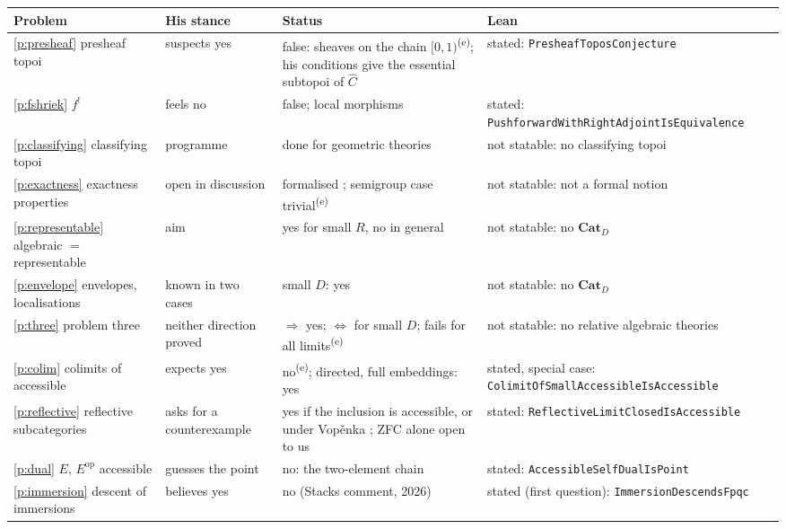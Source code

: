 \documentclass[11pt,a4paper]{amsart}
\theoremstyle{definition}
\theoremstyle{remark}
\newcommand{\Cat}{\mathbf{Cat}}
\newcommand{\own}{\textsuperscript{(e)}}
\newcommand{\lean}[1]{\texttt{#1}}
\begin{document}
\begin{table}[ht]
\small
\begin{tabularx}{\linewidth}{@{}>{\raggedright\arraybackslash}p{3.3cm}>{\raggedright\arraybackslash}p{2.6cm}Y>{\raggedright\arraybackslash}p{3.3cm}@{}}
\toprule
Problem & His stance & Status & Lean \\
\midrule
\ref{p:presheaf} presheaf topoi & suspects yes & false: sheaves on the chain $[0,1)$\own; his conditions give the essential subtopoi of $\widehat C$ \cite{lw} & stated: \lean{Presheaf\allowbreak Topos\allowbreak Conjecture} \\
\ref{p:fshriek} $f^!$ & feels no & false; local morphisms \cite{jm} & stated: \lean{Pushforward\allowbreak With\allowbreak Right\allowbreak Adjoint\allowbreak Is\allowbreak Equivalence} \\
\ref{p:classifying} classifying topoi & programme & done for geometric theories & not statable: no classifying topoi \\
\ref{p:exactness} exactness properties & open in discussion & formalised \cite{jacqmin}; semigroup case trivial\own & not statable: not a formal notion \\
\ref{p:representable} algebraic $=$ representable & aim & yes for small $R$, no in general & not statable: no $\Cat_D$ \\
\ref{p:envelope} envelopes, localisations & known in two cases & small $D$: yes \cite{kelly,bkp} & not statable: no $\Cat_D$ \\
\ref{p:three} problem three & neither direction proved & $\Rightarrow$ yes; $\Leftrightarrow$ for small $D$; fails for all limits\own & not statable: no relative algebraic theories \\
\ref{p:colim} colimits of accessible & expects yes & no\own; directed, full embeddings: yes \cite{pr} & stated, special case: \lean{Colimit\allowbreak Of\allowbreak Small\allowbreak Accessible\allowbreak Is\allowbreak Accessible} \\
\ref{p:reflective} reflective subcategories & asks for a counterexample & yes if the inclusion is accessible, or under Vop\v{e}nka \cite{ar}; ZFC alone open to us & stated: \lean{Reflective\allowbreak Limit\allowbreak Closed\allowbreak Is\allowbreak Accessible} \\
\ref{p:dual} $E$, $E^{\mathrm{op}}$ accessible & guesses the point & no: the two-element chain \cite{gu} & stated: \lean{Accessible\allowbreak Self\allowbreak Dual\allowbreak Is\allowbreak Point} \\
\ref{p:immersion} descent of immersions & believes yes & no (Stacks comment, 2026) & stated (first question): \lean{Immersion\allowbreak Descends\allowbreak Fpqc} \\

\end{tabularx}
\end{table}
\end{document}
